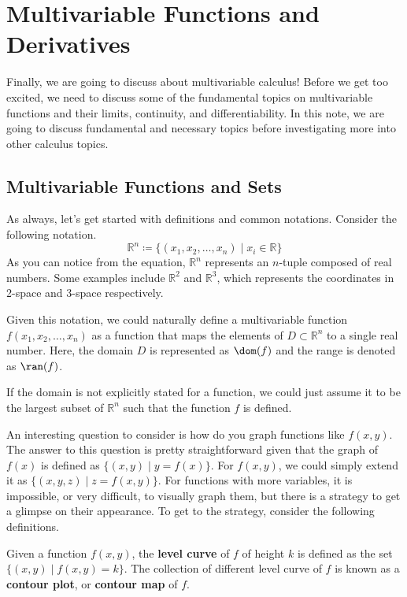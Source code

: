 \documentclass[../../../main.tex]{subfiles}
\begin{document}
\chapter{Multivariable Functions and Derivatives}

Finally, we are going to discuss about multivariable calculus!
Before we get too excited, we need to discuss some of the fundamental
topics on multivariable functions and their limits, continuity, and
differentiability. In this note, we are going to discuss fundamental
and necessary topics before investigating more into other calculus
topics.

\section{Multivariable Functions and Sets}

As always, let's get started with definitions and common notations.
Consider the following notation.
\[
\mathbb{R}^n
\coloneqq \{ (x_1, x_2, \ldots, x_n) \mid x_i \in \mathbb{R} \}
\]
As you can notice from the equation, $\mathbb{R}^n$ represents an
$n$-tuple composed of real numbers. Some examples include
$\mathbb{R}^2$ and $\mathbb{R}^3$, which represents the coordinates in
2-space and 3-space respectively.

\begin{important}
Given this notation, we could naturally define a multivariable
function $f(x_1, x_2, \ldots, x_n)$ as a function that maps
the elements of $D \subset \mathbb{R}^n$ to a single real number.
Here, the domain $D$ is represented as $\dom(f)$ and the range
is denoted as $\ran(f)$.
\end{important}

If the domain is not explicitly stated for a function, we could just
assume it to be the largest subset of $\mathbb{R}^n$ such that the
function $f$ is defined.

An interesting question to consider is how do you graph functions like
$f(x, y)$. The answer to this question is pretty straightforward given
that the graph of $f(x)$ is defined as $\{ (x, y) \mid y = f(x) \}$.
For $f(x, y)$, we could simply extend it as $\{ (x, y, z) \mid
z = f(x, y) \}$. For functions with more variables, it is impossible,
or very difficult, to visually graph them, but there is a strategy
to get a glimpse on their appearance. To get to the strategy,
consider the following definitions.

\begin{definition}{}{}
Given a function $f(x, y)$, the \textbf{level curve} of $f$ of height
$k$ is defined as the set $\{ (x, y) \mid f(x, y) = k \}$.
The collection of different level curve of $f$ is known as a
\textbf{contour plot}, or \textbf{contour map} of $f$.
\end{definition}
\end{document}

